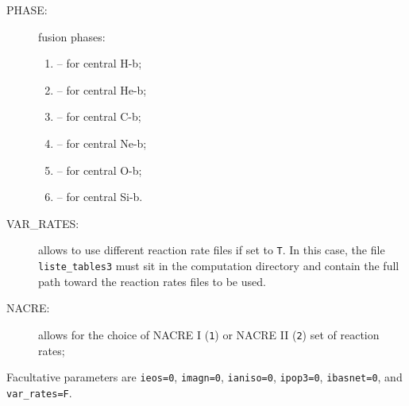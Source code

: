 \documentclass[11pt]{article}
\begin{document}
\begin{description}
\begin{description}
      \item[PHASE:] fusion phases:
        \begin{enumerate}[labelindent=.5cm,font=\ttfamily \bfseries,label=\arabic*:]
          \item[1] -- for central H-b;
          \item[2] -- for central He-b;
          \item[3] -- for central C-b;
          \item[4] -- for central Ne-b;
          \item[5] -- for central O-b;
          \item[6] -- for central Si-b.
        \end{enumerate}
      \item[VAR\_RATES:] allows to use different reaction rate files if set to \texttt{T}. In this case, the file \texttt{liste\_tables3} must sit in the computation directory and contain the full path toward the reaction rates files to be used.
      \item[NACRE:] allows for the choice of NACRE I (\texttt{1}) or NACRE II (\texttt{2}) set of reaction rates;
    \end{description}
    Facultative parameters are \texttt{ieos=0}, \texttt \texttt{imagn=0}, \texttt{ianiso=0}, \texttt{ipop3=0}, \texttt{ibasnet=0}, and \texttt{var\_rates=F}.


\end{description}
\end{document}

